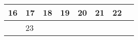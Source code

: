{\begin{tabularx}{\linewidth}{|l!{\vrule width \myLenLineThicknessThick}*{7}{@{}X@{}|}}
        \begin{minipage}[t]{6mm}\centering{}16\end{minipage}
      
       & 
    
      
      
        \begin{minipage}[t]{6mm}\centering{}17\end{minipage}
      
       & 
    
      
      
        \begin{minipage}[t]{6mm}\centering{}18\end{minipage}
      
       & 
    
      
      
        \begin{minipage}[t]{6mm}\centering{}19\end{minipage}
      
       & 
    
      
      
        \begin{minipage}[t]{6mm}\centering{}20\end{minipage}
      
       & 
    
      
      
        \begin{minipage}[t]{6mm}\centering{}21\end{minipage}
      
       & 
    
      
      
        \begin{minipage}[t]{6mm}\centering{}22\end{minipage}
      
      
        \\  \hline 
      
    
  
  
  
  \hyperlink{week-2026-47}{} &
    
      
      
        \begin{minipage}[t]{6mm}\centering{}23\end{minipage}
      
       & 
    

\end{tabularx}}

